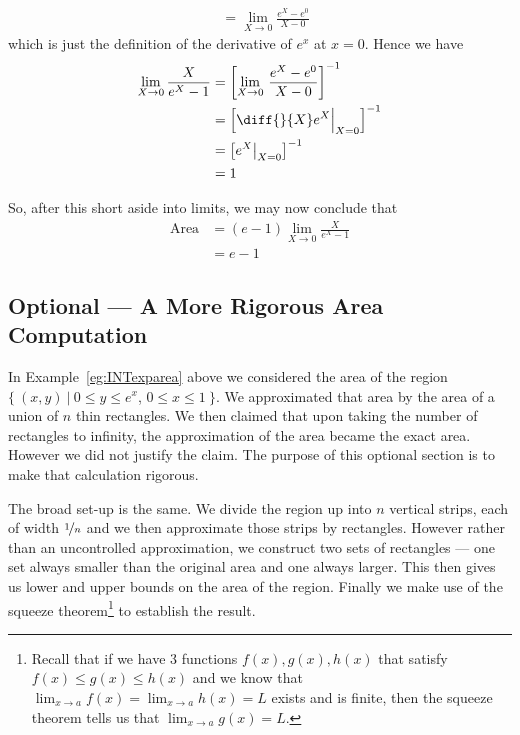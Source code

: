 \begin{eg}
\begin{itemize}
\begin{align*}
&= \lim_{X\rightarrow 0} \frac{e^X-e^0}{X-0}
\end{align*}
which is just the definition of the derivative of $e^x$ at $x=0$. Hence we have
\begin{align*}
\lim_{X\rightarrow 0} \frac{X}{e^X-1}
&=\left[\lim_{X\rightarrow 0}\, \frac{e^X-e^0}{X-0} \right]^{-1} \\
&=\left[\diff{}{X}e^X\Big|_{X=0} \right]^{-1} \\
&=\left[e^X\big|_{X=0}\right]^{-1} \\
&=1
\end{align*}
\end{itemize}
So, after this short aside into limits, we may now conclude that
\begin{align*}
\text{Area}
&=(e-1)\lim_{X\rightarrow 0} \frac{X}{e^X-1} \\
&=e-1
\end{align*}
\addtocounter{theorem}{-1}%
\end{eg}
\addtocounter{theorem}{1}%


\subsection{Optional --- A More Rigorous Area Computation}
In Example~\ref{eg:INTexparea} above we considered the area of the region
$\big\{\ (x,y)\ \big|\ 0\le y\le e^x$, $0\le x\le 1\ \big\}$. We approximated that area
by
the area of a union of $n$ thin rectangles. We then claimed that upon taking
the number of rectangles to infinity, the approximation of the area became the
exact area. However we did not justify the claim. The purpose of this optional
section is to make that calculation rigorous.

The broad set-up is the same. We divide the region up into $n$ vertical strips,
each of width $\nicefrac1n$ and we then approximate those strips by rectangles.
However rather than an uncontrolled approximation, we construct two sets of
rectangles --- one set always smaller than the original area and one always
larger. This then gives us lower and upper bounds on the area of the region.
Finally we make use of the squeeze
theorem\footnote{
Recall that if we have 3 functions $f(x), g(x), h(x)$ that satisfy $f(x) \leq g(x) \leq
h(x)$ and we know that $\lim_{x \to a} f(x) = \lim_{x\to a} h(x) = L$ exists and is
finite, then the squeeze theorem tells us that $\lim_{x\to a} g(x) = L$.} to establish
the result.

